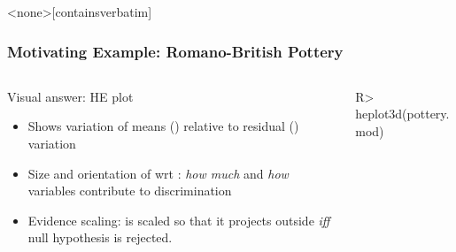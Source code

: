 \begin{frame}<none>[containsverbatim]
	\frametitle{Motivating Example: Romano-British Pottery}
\begin{columns}
 \begin{column}{0.5\textwidth}
  \begin{block}{Visual answer: HE plot}
  \begin{itemize}
  	\item Shows variation of means () relative to residual
  	() variation
  	\item Size and orientation of  wrt : \emph{how much}
  	and \emph{how} variables contribute to discrimination
  	\item Evidence scaling:  is scaled so that it projects
  	outside  \emph{iff} null hypothesis is rejected.
	\end{itemize}
 \end{block}
  \href{run:powerpoint.bat}{}
 \end{column}
 \begin{column}{0.5\textwidth}
  \begin{CodeInput}
  R> heplot3d(pottery.mod)
  \end{CodeInput}
 \end{column}
\end{columns}
	
\end{frame}


